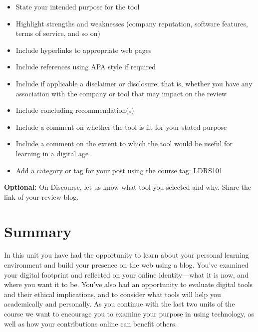 \documentclass[
  letterpaper,
  DIV=11,
  numbers=noendperiod]{scrreprt}
\providecommand{\tightlist}{%
  \setlength{\itemsep}{0pt}\setlength{\parskip}{0pt}}\usepackage{longtable,booktabs,array}
\begin{document}
\begin{tcolorbox}
\begin{itemize}
  \begin{itemize}
  \tightlist
  \item
    State your intended purpose for the tool
  \item
    Highlight strengths and weaknesses (company reputation, software
    features, terms of service, and so on)
  \item
    Include hyperlinks to appropriate web pages
  \item
    Include references using APA style if required
  \item
    Include if applicable a disclaimer or disclosure; that is, whether
    you have any association with the company or tool that may impact on
    the review
  \item
    Include concluding recommendation(s)
  \item
    Include a comment on whether the tool is fit for your stated purpose
  \item
    Include a comment on the extent to which the tool would be useful
    for learning in a digital age
  \item
    Add a category or tag for your post using the course tag: LDRS101
  \end{itemize}
\end{itemize}

\textbf{Optional:} On Discourse, let us know what tool you selected and
why. Share the link of your review blog.

\end{tcolorbox}

\section*{Summary}\label{summary-3}


In this unit you have had the opportunity to learn about your personal
learning environment and build your presence on the web using a blog.
You've examined your digital footprint and reflected on your online
identity---what it is now, and where you want it to be. You've also had
an opportunity to evaluate digital tools and their ethical implications,
and to consider what tools will help you academically and personally. As
you continue with the last two units of the course we want to encourage
you to examine your purpose in using technology, as well as how your
contributions online can benefit others.
\end{document}
